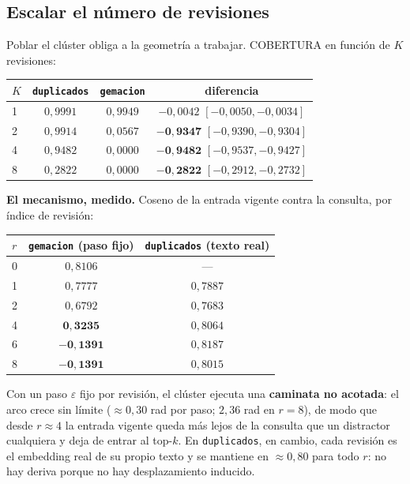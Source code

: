 \documentclass[11pt,a4paper]{article}
\begin{document}
\subsection{Escalar el número de revisiones}

Poblar el clúster obliga a la geometría a trabajar. COBERTURA en función de $K$ revisiones:

\begin{center}
\begin{tabular}{lccc}
\toprule
$K$ & \texttt{duplicados} & \texttt{gemacion} & diferencia \\
\midrule
1 & $0{,}9991$ & $0{,}9949$ & $-0{,}0042$ $[-0{,}0050, -0{,}0034]$ \\
2 & $0{,}9914$ & $0{,}0567$ & $\mathbf{-0{,}9347}$ $[-0{,}9390, -0{,}9304]$ \\
4 & $0{,}9482$ & $0{,}0000$ & $\mathbf{-0{,}9482}$ $[-0{,}9537, -0{,}9427]$ \\
8 & $0{,}2822$ & $0{,}0000$ & $\mathbf{-0{,}2822}$ $[-0{,}2912, -0{,}2732]$ \\
\bottomrule
\end{tabular}
\end{center}

\textbf{El mecanismo, medido.} Coseno de la entrada vigente contra la consulta, por índice de
revisión:

\begin{center}
\begin{tabular}{lcc}
\toprule
$r$ & \texttt{gemacion} (paso fijo) & \texttt{duplicados} (texto real) \\
\midrule
0 & $0{,}8106$ & --- \\
1 & $0{,}7777$ & $0{,}7887$ \\
2 & $0{,}6792$ & $0{,}7683$ \\
4 & $\mathbf{0{,}3235}$ & $0{,}8064$ \\
6 & $\mathbf{-0{,}1391}$ & $0{,}8187$ \\
8 & $\mathbf{-0{,}1391}$ & $0{,}8015$ \\
\bottomrule
\end{tabular}
\end{center}

Con un paso $\varepsilon$ fijo por revisión, el clúster ejecuta una \textbf{caminata no acotada}: el
arco crece sin límite ($\approx 0{,}30$ rad por paso; $2{,}36$ rad en $r=8$), de modo que desde
$r \approx 4$ la entrada vigente queda más lejos de la consulta que un distractor cualquiera y deja de
entrar al top-$k$. En \texttt{duplicados}, en cambio, cada revisión es el embedding real de su propio
texto y se mantiene en $\approx 0{,}80$ para todo $r$: no hay deriva porque no hay desplazamiento
inducido.
\end{document}
